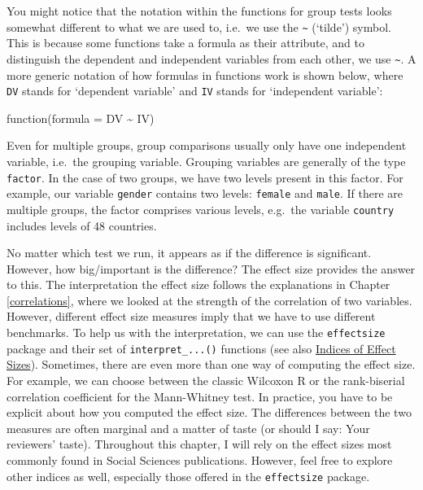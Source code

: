 \documentclass[
]{book}
\begin{document}
You might notice that the notation within the functions for group tests looks somewhat different to what we are used to, i.e.~we use the \texttt{\textasciitilde{}} (`tilde') symbol. This is because some functions take a formula as their attribute, and to distinguish the dependent and independent variables from each other, we use \texttt{\textasciitilde{}}. A more generic notation of how formulas in functions work is shown below, where \texttt{DV} stands for `dependent variable' and \texttt{IV} stands for `independent variable':

\leavevmode\hypertarget{formulas-in-functions}{}%
function(formula = DV \textasciitilde{} IV)

Even for multiple groups, group comparisons usually only have one independent variable, i.e.~the grouping variable. Grouping variables are generally of the type \texttt{factor}. In the case of two groups, we have two levels present in this factor. For example, our variable \texttt{gender} contains two levels: \texttt{female} and \texttt{male}. If there are multiple groups, the factor comprises various levels, e.g.~the variable \texttt{country} includes levels of 48 countries.

No matter which test we run, it appears as if the difference is significant. However, how big/important is the difference? The effect size provides the answer to this. The interpretation the effect size follows the explanations in Chapter \ref{correlations}, where we looked at the strength of the correlation of two variables. However, different effect size measures imply that we have to use different benchmarks. To help us with the interpretation, we can use the \texttt{effectsize} package and their set of \texttt{interpret\_...()} functions (see also \href{https://easystats.github.io/effectsize/articles/interpret.html}{Indices of Effect Sizes}). Sometimes, there are even more than one way of computing the effect size. For example, we can choose between the classic Wilcoxon R or the rank-biserial correlation coefficient for the Mann-Whitney test. In practice, you have to be explicit about how you computed the effect size. The differences between the two measures are often marginal and a matter of taste (or should I say: Your reviewers' taste). Throughout this chapter, I will rely on the effect sizes most commonly found in Social Sciences publications. However, feel free to explore other indices as well, especially those offered in the \texttt{effectsize} package.
\end{document}
